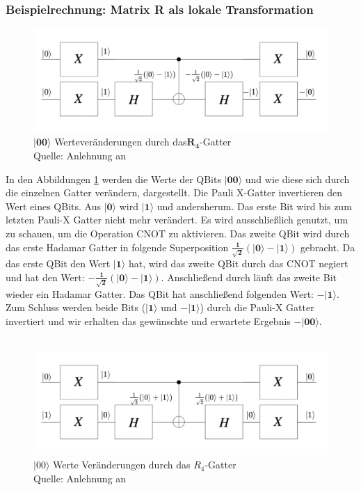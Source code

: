 \subsubsection{Beispielrechnung: Matrix R als lokale Transformation}
 \begin{figure}[hbtp]
	\centering
	\includegraphics[width=.8\textwidth]{figures/RGatter00.png}
	\caption{$\mathbf{|00\rangle}$ Werteveränderungen durch das$\mathbf{R_4}$-Gatter \\ Quelle: Anlehnung an \cite[S. 145]{Ho17}}
	\label{fig:Rgatter00}
\end{figure}
 In den Abbildungen \ref{fig:Rgatter00} werden die Werte der QBits $\mathbf{|00\rangle}$ und wie diese sich durch die einzelnen Gatter verändern, dargestellt.
 Die Pauli X-Gatter invertieren den Wert eines QBits. Aus $\mathbf{|0\rangle}$ wird $\mathbf{|1\rangle}$ und andersherum. Das erste Bit wird bis zum letzten Pauli-X Gatter nicht mehr verändert. Es wird ausschließlich genutzt, um zu schauen, um die Operation CNOT zu aktivieren. Das zweite QBit wird durch das erste Hadamar Gatter in folgende Superposition $\mathbf{\frac{1}{\sqrt 2}(|0\rangle - |1\rangle)}$ gebracht. Da das erste QBit den Wert $\mathbf{|1\rangle}$ hat, wird das zweite QBit durch das CNOT negiert und hat den Wert: $\mathbf{-\frac{1}{\sqrt 2}(|0\rangle - |1\rangle)}$. Anschließend durch läuft das zweite Bit wieder ein Hadamar Gatter. Das QBit hat anschließend folgenden Wert: $\mathbf{-|1\rangle}$.
 Zum Schluss werden beide Bits ($\mathbf{|1\rangle}$ und $\mathbf{-|1\rangle}$) durch die Pauli-X Gatter invertiert und wir erhalten das gewünschte und erwartete Ergebnis $\mathbf{-|00\rangle}$.
  \\
  \\
   \begin{figure}[hbtp]
  	\centering
  	\includegraphics[width=.8\textwidth]{figures/RGatter01.png}
  	\caption{$|00\rangle$ Werte Veränderungen durch das $R_4$-Gatter \\ Quelle: Anlehnung an \cite[S. 145]{Ho17}}
  	\label{fig:Rgatter01}
  \end{figure}
